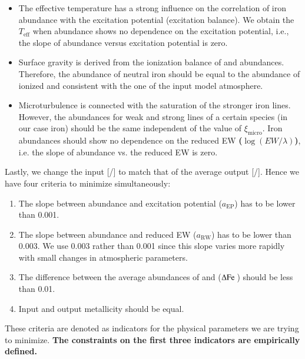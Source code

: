 \documentclass{aa}
\begin{document}
\begin{itemize}
    \item The effective temperature has a strong influence on the correlation
          of iron abundance with the excitation potential (excitation balance).
          We obtain the $T_\mathrm{eff}$ when  abundance shows no
          dependence on the excitation potential, i.e., the slope of abundance
          versus excitation potential is zero.
    \item Surface gravity is derived from the ionization balance of 
          and  abundances. Therefore, the abundance of neutral iron
          should be equal to the abundance of ionized and consistent with the
          one of the input model atmosphere.
    \item Microturbulence is connected with the saturation of the stronger iron
          lines. However, the abundances for weak and strong lines of a certain
          species (in our case iron) should be the same independent of the value
          of $\xi_\mathrm{micro}$. Iron abundances should show no dependence on
          the reduced EW {\bf ($\log(EW/\lambda)$)}, i.e. the slope of abundance vs. the reduced EW is zero.
\end{itemize}
Lastly, we change the input [/] to match
that of the average output [/]. Hence we have four criteria to
minimize simultaneously:

\begin{enumerate}
    \item The slope between abundance and excitation potential ($a_\mathrm{EP}$)
          has to be lower than 0.001.
    \item The slope between abundance and reduced EW ($a_\mathrm{RW}$) has to be
          lower than 0.003. We use 0.003 rather than 0.001 since this slope
          varies more rapidly with small changes in atmospheric parameters.
    \item The difference between the average abundances of  and
           ($\Delta\ion{Fe}{}$) should be less than 0.01.
    \item Input and output metallicity should be equal.
\end{enumerate}
These criteria are denoted as indicators for the physical parameters we are
trying to minimize. {\bf The constraints on the first three indicators are
empirically defined.}
\end{document}
